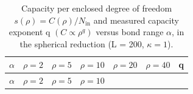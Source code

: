 \documentclass[aps,prd,preprint,nofootinbib,superscriptaddress]{revtex4-2}
\begin{document}
\begin{longtable}[]{@{}
  >{\raggedright\arraybackslash}p{}
  >{\raggedright\arraybackslash}p{}
  >{\raggedright\arraybackslash}p{}
  >{\raggedright\arraybackslash}p{}
  >{\raggedright\arraybackslash}p{}
  >{\raggedright\arraybackslash}p{}
  >{\raggedright\arraybackslash}p{}@{}}
\caption{Capacity per enclosed degree of freedom
\(s(\rho ) = C(\rho )/N_{\mathrm{in}}\) and measured capacity exponent q
\((C \propto  \rho ^{q})\) versus bond range \(\alpha\), in the
spherical reduction (L = 200, \(\kappa  = 1\)).}\tabularnewline
\toprule\noalign{}
\begin{minipage}[b]{\linewidth}\raggedright
\(\alpha\)
\end{minipage} & \begin{minipage}[b]{\linewidth}\raggedright
\(\rho =2\)
\end{minipage} & \begin{minipage}[b]{\linewidth}\raggedright
\(\rho =5\)
\end{minipage} & \begin{minipage}[b]{\linewidth}\raggedright
\(\rho =10\)
\end{minipage} & \begin{minipage}[b]{\linewidth}\raggedright
\(\rho =20\)
\end{minipage} & \begin{minipage}[b]{\linewidth}\raggedright
\(\rho =40\)
\end{minipage} & \begin{minipage}[b]{\linewidth}\raggedright
q
\end{minipage} \\
\midrule\noalign{}
\endfirsthead
\toprule\noalign{}
\begin{minipage}[b]{\linewidth}\raggedright
\(\alpha\)
\end{minipage} & \begin{minipage}[b]{\linewidth}\raggedright
\(\rho =2\)
\end{minipage} & \begin{minipage}[b]{\linewidth}\raggedright
\(\rho =5\)
\end{minipage} & \begin{minipage}[b]{\linewidth}\raggedright
\(\rho =10\)

\end{minipage}
\end{longtable}
\end{document}
